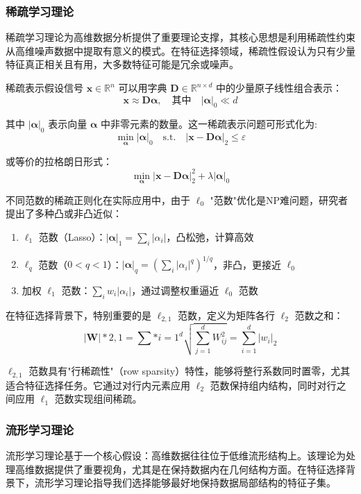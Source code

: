 \documentclass[12pt,a4paper,UTF8]{article}
\begin{document}
  
  \subsubsection{稀疏学习理论}
  稀疏学习理论为高维数据分析提供了重要理论支撑，其核心思想是利用稀疏性约束从高维噪声数据中提取有意义的模式。在特征选择领域，稀疏性假设认为只有少量特征真正相关且有用，大多数特征可能是冗余或噪声。
  
  稀疏表示假设信号 $\mathbf{x} \in \mathbb{R}^n$ 可以用字典 $\mathbf{D} \in \mathbb{R}^{n \times d}$ 中的少量原子线性组合表示：
  $$
  \mathbf{x} \approx \mathbf{D}\boldsymbol{\alpha}, \quad \text{其中} \quad |\boldsymbol{\alpha}|_0 \ll d
  $$
  
  
  其中 $|\boldsymbol{\alpha}|_0$ 表示向量 $\boldsymbol{\alpha}$ 中非零元素的数量。这一稀疏表示问题可形式化为:
  $$
  \min_{\boldsymbol{\alpha}} |\boldsymbol{\alpha}|_0 \quad \text{s.t.} \quad |\mathbf{x} - \mathbf{D}\boldsymbol{\alpha}|_2 \leq \varepsilon
  $$
  
  
  或等价的拉格朗日形式：
  $$
  \min_{\boldsymbol{\alpha}} |\mathbf{x} - \mathbf{D}\boldsymbol{\alpha}|_2^2 + \lambda|\boldsymbol{\alpha}|_0
  $$
  
  
  不同范数的稀疏正则化在实际应用中，由于 $\ell_0$ "范数"优化是NP难问题，研究者提出了多种凸或非凸近似：
    \begin{enumerate}
  	\item $\ell_1$ 范数（Lasso）：$|\boldsymbol{\alpha}|_1 = \sum_i |\alpha_i|$，凸松弛，计算高效
  	\item $\ell_q$ 范数（$0 < q < 1$）：$|\boldsymbol{\alpha}|_q = (\sum_i |\alpha_i|^q)^{1/q}$，非凸，更接近 $\ell_0$
  	\item  加权 $\ell_1$ 范数：$\sum_i w_i|\alpha_i|$，通过调整权重逼近 $\ell_0$ 范数
  \end{enumerate}
  

  在特征选择背景下，特别重要的是 $\ell_{2,1}$ 范数，定义为矩阵各行 $\ell_2$ 范数之和：
  $$
  |\mathbf{W}|*{2,1} = \sum*{i=1}^{d} \sqrt{\sum_{j=1}^{d} W_{ij}^2} = \sum_{i=1}^{d} |w_i|_2
  $$
  
  
  $\ell_{2,1}$ 范数具有"行稀疏性"（row sparsity）特性，能够将整行系数同时置零，尤其适合特征选择任务。它通过对行内元素应用 $\ell_2$ 范数保持组内结构，同时对行之间应用 $\ell_1$ 范数实现组间稀疏。
  
  \subsubsection{流形学习理论}
  流形学习理论基于一个核心假设：高维数据往往位于低维流形结构上。该理论为处理高维数据提供了重要视角，尤其是在保持数据内在几何结构方面。在特征选择背景下，流形学习理论指导我们选择能够最好地保持数据局部结构的特征子集。
  
\end{document}
